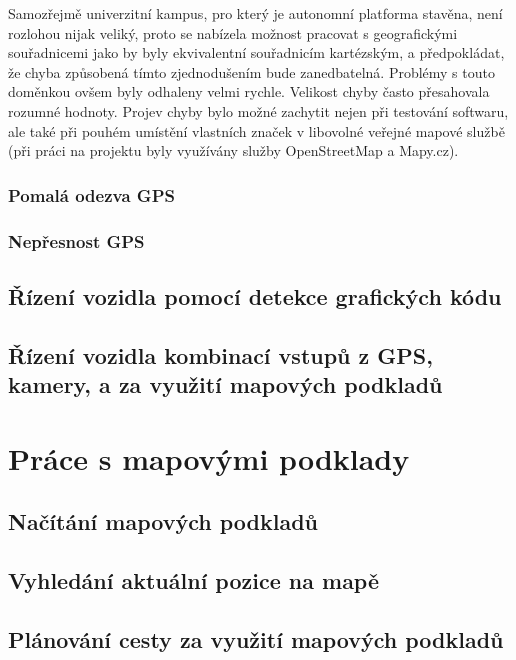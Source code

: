 \documentclass[czech,bachelor,dept460,male,cpp,cpdeclaration]{diploma}
\begin{document}
Samozřejmě univerzitní kampus, pro který je autonomní platforma stavěna, není rozlohou nijak veliký, proto se nabízela možnost
pracovat s geografickými souřadnicemi jako by byly ekvivalentní souřadnicím kartézským, a předpokládat, že chyba způsobená tímto
zjednodušením bude zanedbatelná. Problémy s touto doměnkou ovšem byly odhaleny velmi rychle. Velikost chyby často přesahovala 
rozumné hodnoty. Projev chyby bylo možné zachytit nejen při testování softwaru, ale také při pouhém umístění vlastních značek
v libovolné veřejné mapové službě (při práci na projektu byly využívány služby OpenStreetMap a Mapy.cz). 

\subsubsection{Pomalá odezva GPS}

\subsubsection{Nepřesnost GPS} \label{gps-inaccuracy}


\subsection{Řízení vozidla pomocí detekce grafických kódu}

\subsection{Řízení vozidla kombinací vstupů z GPS, kamery, a za využití mapových podkladů}

\section{Práce s mapovými podklady} \label{osm-chapter}

\subsection{Načítání mapových podkladů}

\subsection{Vyhledání aktuální pozice na mapě}

\subsection{Plánování cesty za využití mapových podkladů}
\end{document}
